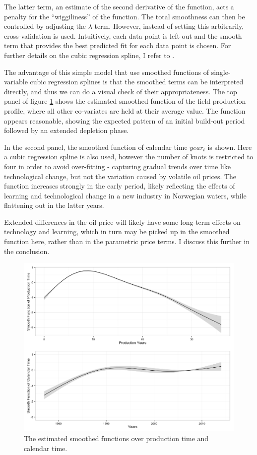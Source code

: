 \documentclass[11pt]{article}
\begin{document}
The latter term, an estimate of the second derivative of the function, acts a penalty for the ``wiggiliness'' of the function. The total smoothness can then be controlled by adjusting the $\lambda$ term. However, instead of setting this arbitrarily, cross-validation is used. Intuitively, each data point is left out and the smooth term that provides the best predicted fit for each data point is chosen.  For further details on the cubic regression spline, I refer to \citet{wood_generalized_2006}.

The advantage of this simple model that use smoothed functions of single-variable cubic regression splines is that the smoothed terms can be interpreted directly, and thus we can do a visual check of their appropriateness. The top panel of figure \ref{smooths} shows the estimated smoothed function of the field production profile, where all other co-variates are held at their average value.  The function appears reasonable, showing the expected pattern of an initial build-out period followed by an extended depletion phase. 

In the second panel, the smoothed function of calendar time $year_t$ is shown. Here a cubic regression spline is also used, however the number of knots is restricted to four in order to avoid over-fitting - capturing gradual trends over time like technological change, but not the variation  caused by volatile oil prices. The function increases strongly in the early period, likely reflecting the effects of learning and technological change in a new industry in Norwegian waters, while flattening out in the latter years. 

Extended differences in the oil price will likely have some long-term effects on technology and learning, which in turn may be picked up in the smoothed function here, rather than in the parametric price terms.  I discuss this further in the conclusion.  

\begin{figure}
	\includegraphics[width=1\textwidth]{figures/smooths.png}
	\caption{The estimated smoothed functions over production time and calendar time.}
	\label{smooths}
\end{figure}
\end{document}
